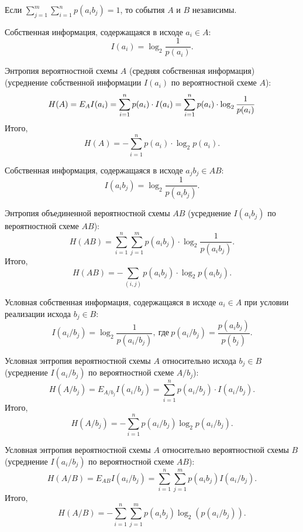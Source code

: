\documentclass{article}
\begin{document}
Если $\sum\limits_{j=1}^{m}\sum\limits_{i=1}^{n}p(a_ib_j) = 1$, то события $A$ и $B$ независимы.

\opr Собственная информация, содержащаяся в исходе $a_i \in A$:
$$
I(a_i) = \log_2{\frac{1}{p(a_i)}}.
$$

\opr Энтропия вероятностной схемы $A$ (средняя собственная информация) (усреднение собственной информации $I(a_i)$ по вероятностной схеме $A$):
$$
    H(A) = E_A I(a_i) = \sum_{i=1}^{n} p(a_i) \cdot I(a_i) = \sum_{i=1}^{n} p(a_i) \cdot \log_2{\frac{1}{p(a_i)}}\\
$$
Итого,
$$
    H(A) = - \sum_{i=1}^{n} p(a_i) \cdot \log_2{p(a_i)}.
$$

\opr Собственная информация, содержащаяся в исходе $a_jb_j \in AB$:
$$
I(a_ib_j) = \log_2{\frac{1}{p(a_ib_j)}}.
$$

\opr Энтропия объединенной вероятностной схемы $AB$ (усреднение $I(a_ib_j)$ по вероятностной схеме $AB$):
$$
H(AB) = \sum_{i=1}^{n}\sum_{j=1}^{m} p(a_ib_j)\cdot \log_2{\frac{1}{p(a_ib_j)}}.
$$
Итого,
$$
H(AB) = - \sum_{(i, j)} p(a_ib_j) \cdot \log_2{p(a_ib_j)}.
$$

\opr Условная собственная информация, содержащаяся в исходе $a_i \in A$ при условии реализации исхода $b_j \in B$:
$$
I(a_i / b_j) = \log_2{\frac{1}{p(a_i / b_j)}},\ \text{где}\  p(a_i/b_j) = \frac{p(a_ib_j)}{p(b_j)}.
$$

\opr Условная энтропия вероятностной схемы $A$ относительно исхода $b_j \in B$ (усреднение $I(a_i/b_j)$ по вероятностной схеме $A/b_j$):
$$
H(A/b_j) = E_{A/b_j} I(a_i/b_j) = \sum_{i=1}^{n}p(a_i/b_j) \cdot I(a_i/b_j).
$$
Итого,
$$
H(A/b_j) = - \sum_{i=1}^{n} p(a_i / b_j) \log_2{p(a_i / b_j)}.
$$

\opr Условная энтропия вероятностной схемы $A$ относительно вероятностной схемы $B$ (усреднение $I(a_i/b_j)$ по вероятностной схеме $AB$):
$$
H(A/B) = E_{AB} I(a_i/b_j) = \sum_{i=1}^{n} \sum_{j=1}^{m} p(a_ib_j) I(a_i/b_j).
$$
Итого,
$$
H(A/B) = - \sum_{i=1}^{n} \sum_{j=1}^{m} p(a_ib_j) \log_2(p(a_i/b_j)).
$$
\end{document}
